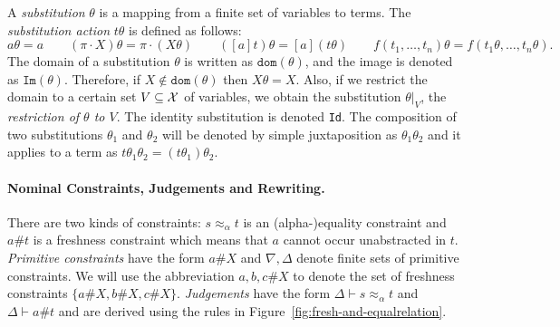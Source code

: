 \documentclass[11pt,a4paper]{amsart}
\newcommand{\daniele}[1]{\textcolor{cyan}{#1}}
\newcommand{\aleq}{\approx_{\alpha}}
\newcommand{\alert}[1]{\textcolor{red}{#1}}
\theoremstyle{plain}
\theoremstyle{definition}
\newtheorem{definition}[theorem]{Definition}
\theoremstyle{remark}
\begin{document}

A \emph{substitution} $\theta$ is a mapping from a finite set of variables to terms. The \emph{substitution action} $t\theta$ is defined as follows:
$$a\theta = a \qquad (\pi\cdot X)\theta = \pi\cdot(X\theta) \qquad ([a]t)\theta = [a](t\theta) \qquad f(t_1,\ldots, t_n)\theta = f(t_1\theta,\ldots, t_n\theta).$$
The domain of a substitution $\theta$ is written as $\texttt{dom}(\theta)$, and the image is denoted as $\texttt{Im}(\theta)$. Therefore, if $X \not\in \texttt{dom}(\theta)$ then $X\theta = X$. Also, if we restrict the domain to a certain set $V\subseteq {\cal X}$ of variables,  we obtain the substitution $\theta|_V$,  the \emph{restriction of $\theta$ to $V$}.
The identity substitution is denoted {\tt Id}.  The composition of two substitutions $\theta_1$ and $\theta_2$ will be denoted by simple juxtaposition 
as $\theta_1\theta_2$ and it applies to a term as $t\theta_1\theta_2=(t\theta_1)\theta_2$.



     
\paragraph{Nominal Constraints, Judgements and Rewriting.} There are two kinds of constraints: $s\aleq t$ is an (alpha-)equality constraint and $a\#t$ is a freshness constraint which means that $a$ cannot occur unabstracted in $t$. {\em Primitive constraints} have the form $a\#X$ and $\nabla,\Delta$ denote finite sets of primitive constraints. We will use the abbreviation $a,b,c\# X$ to denote the set of freshness constraints $\{a\# X, b\# X, c\# X\}$. {\em Judgements} have the form $\Delta\vdash s\aleq t$ and $\Delta\vdash a\# t$ and are derived using the rules in Figure~\ref{fig:fresh-and-equalrelation}. 
\end{document}
